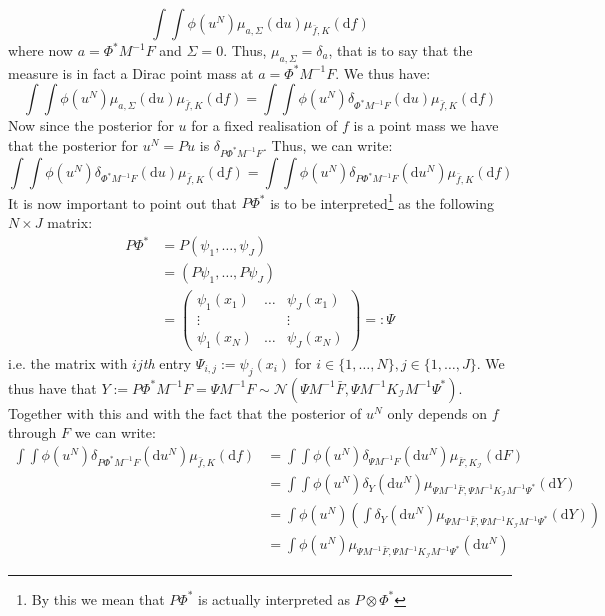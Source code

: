 \documentclass{article}
\theoremstyle{definition}
\theoremstyle{remark}
\begin{document}
\begin{equation}
    \int\int\phi(u^{N})\mu_{a,\Sigma}(\mathrm{d}u)\mu_{\bar{f},K}(\mathrm{d}f)
\end{equation}
where now $a=\Phi^{*}M^{-1}F$ and $\Sigma=0$. Thus, $\mu_{a,\Sigma}=\delta_{a}$, that is to say that the measure is in fact a Dirac point mass at $a=\Phi^{*}M^{-1}F$. We thus have:
\begin{equation*}
    \int\int\phi(u^{N})\mu_{a,\Sigma}(\mathrm{d}u)\mu_{\bar{f},K}(\mathrm{d}f)=\int\int\phi(u^N)\delta_{\Phi^{*}M^{-1}F}(\mathrm{d}u)\mu_{\bar{f},K}(\mathrm{d}f)
\end{equation*}
Now since the posterior for $u$ for a fixed realisation of $f$ is a point mass we have that the posterior for $u^N=Pu$ is $\delta_{P\Phi^{*}M^{-1}F}$. Thus, we can write:
\begin{equation*}
    \int\int\phi(u^N)\delta_{\Phi^{*}M^{-1}F}(\mathrm{d}u)\mu_{\bar{f},K}(\mathrm{d}f)=\int\int\phi(u^N)\delta_{P\Phi^{*}M^{-1}F}(\mathrm{d}u^N)\mu_{\bar{f},K}(\mathrm{d}f)
\end{equation*}
It is now important to point out that $P\Phi^{*}$ is to be interpreted\footnote{By this we mean that $P\Phi^{*}$ is actually interpreted as $P\otimes\Phi^{*}$} as the following $N\times J$ matrix:
\begin{align*}
    P\Phi^{*}&=P(\psi_{1},\dots,\psi_{J}) \\
    &=(P\psi_{1},\dots,P\psi_{J}) \\
    &=\begin{pmatrix}
        \psi_{1}(x_1) & \dots & \psi_{J}(x_1) \\
        \vdots & & \vdots \\
        \psi_{1}(x_N) & \dots & \psi_{J}(x_N)
      \end{pmatrix}=:\Psi
\end{align*}
i.e. the matrix with $ij$\textit{th} entry $\Psi_{i,j}:=\psi_{j}(x_{i})$ for $i\in\{1,\dots,N\},j\in\{1,\dots,J\}$. We thus have that $Y:=P\Phi^{*}M^{-1}F=\Psi M^{-1}F\sim\mathcal{N}(\Psi M^{-1}\bar{F},\Psi M^{-1}K_{\mathcal{I}}M^{-1}\Psi^{*})$. Together with this and with the fact that the posterior of $u^{N}$ only depends on $f$ through $F$ we can write:
\begin{align*}
    \int\int\phi(u^N)\delta_{P\Phi^{*}M^{-1}F}(\mathrm{d}u^N)\mu_{\bar{f},K}(\mathrm{d}f)&=\int\int\phi(u^N)\delta_{\Psi M^{-1}F}(\mathrm{d}u^{N})\mu_{\bar{F},K_{\mathcal{I}}}(\mathrm{d}F) \\
    &=\int\int\phi(u^N)\delta_{Y}(\mathrm{d}u^N)\mu_{\Psi M^{-1}\bar{F},\Psi M^{-1}K_{\mathcal{I}}M^{-1}\Psi^{*}}(\mathrm{d}Y) \\
    &=\int\phi(u^N)\left(\int\delta_{Y}(\mathrm{d}u^N)\mu_{\Psi M^{-1}\bar{F},\Psi M^{-1}K_{\mathcal{I}}M^{-1}\Psi^{*}}(\mathrm{d}Y)\right) \\
    &=\int\phi(u^N)\mu_{\Psi M^{-1}\bar{F},\Psi M^{-1}K_{\mathcal{I}}M^{-1}\Psi^{*}}(\mathrm{d}u^N)
\end{align*}
\end{document}
